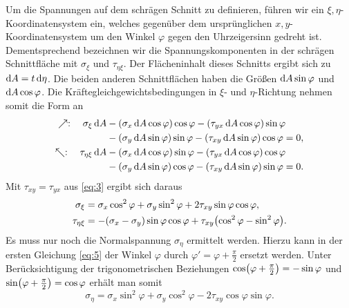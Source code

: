 \documentclass{lecture}
\begin{document}
    Um die Spannungen auf dem schrägen Schnitt zu definieren, führen wir ein \(\xi, \eta\)-Koordinatensystem ein, welches gegenüber dem ursprünglichen \(x, y\)-Koordinatensystem um den Winkel \(\varphi\) gegen den Uhrzeigersinn gedreht ist.
    Dementsprechend bezeichnen wir die Spannungskomponenten in der schrägen Schnittfläche mit \(\sigma_\xi\) und \(\tau_{\eta\xi}\).
    Der Flächeninhalt dieses Schnitts ergibt sich zu \(\mathop{\mathrm{d}\!} A = t\mathop{\mathrm{d}\!}\eta\).
    Die beiden anderen Schnittflächen haben die Größen \(\mathop{\mathrm{d}\!} A\sin\varphi\) und \(\mathop{\mathrm{d}\!} A\cos\varphi\).
    Die Kräftegleichgewichtsbedingungen in \(\xi\)- und \(\eta\)-Richtung nehmen somit die Form an
    \begin{align*}
        \nearrow: \quad \sigma_\xi \d A &- \parentheses*{\sigma_x \d A\cos\varphi}\cos\varphi - \parentheses*{\tau_{yx} \d A\cos\varphi}\sin\varphi\\
        &- \parentheses*{\sigma_y \d A\sin\varphi}\sin\varphi - \parentheses*{\tau_{xy} \d A\sin\varphi}\cos\varphi = 0,\\
        \nwarrow: \quad \tau_{\eta\xi} \d A &- \parentheses*{\sigma_x \d A\cos\varphi}\sin\varphi - \parentheses*{\tau_{yx} \d A\cos\varphi}\cos\varphi\\
        &- \parentheses*{\sigma_y \d A\sin\varphi}\cos\varphi - \parentheses*{\tau_{xy} \d A\sin\varphi}\sin\varphi = 0.
    \end{align*}
    Mit \(\tau_{xy} = \tau_{yx}\) aus \eqref{eq:3} ergibt sich daraus
    \begin{align}\label{eq:5}
        \sigma_\xi &= \sigma_x \cos^2 \varphi + \sigma_y \sin^2 \varphi + 2\tau_{xy}\sin\varphi\cos\varphi,\nonumber\\
        \tau_{\eta\xi} &= -\parentheses*{\sigma_x - \sigma_y}\sin\varphi\cos\varphi + \tau_{xy}\parentheses*{\cos^2 \varphi - \sin^2 \varphi}.
    \end{align}
    Es muss nur noch die Normalspannung \(\sigma_\eta\) ermittelt werden.
    Hierzu kann in der ersten Gleichung \eqref{eq:5} der Winkel \(\varphi\) durch \(\varphi' = \varphi + \frac{\pi}{2}\) ersetzt werden.
    Unter Berücksichtigung der trigonometrischen Beziehungen \(\cos\parentheses*{\varphi + \frac{\pi}{2}} = -\sin\varphi\) und \(\sin\parentheses*{\varphi + \frac{\pi}{2}} = \cos\varphi\) erhält man somit
    \[
        \sigma_\eta = \sigma_x \sin^2 \varphi + \sigma_y \cos^2 \varphi - 2\tau_{xy}\cos\varphi\sin\varphi.
    \]

\end{document}
